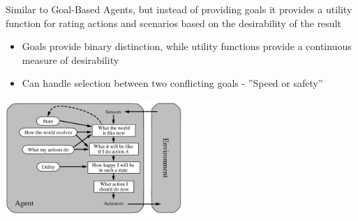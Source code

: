 \documentclass[
../../EiKI_Summary.tex,
]
{subfiles}
\begin{document}
\begin{defbox}
    Similar to Goal-Based Agents, but instead of providing goals it provides a utility function for rating actions and scenarios based on the desirability of the result
    \begin{itemize}
        \item Goals provide binary distinction, while utility functions provide a continuous measure of desirability
        \item Can handle selection between two conflicting goals - ''Speed or safety''
    \end{itemize}

    \begin{center}
        \includegraphics[width=0.5\textwidth]{Pics/02/UtilityBasedAgent.png}
    \end{center}
\end{defbox}
\end{document}
